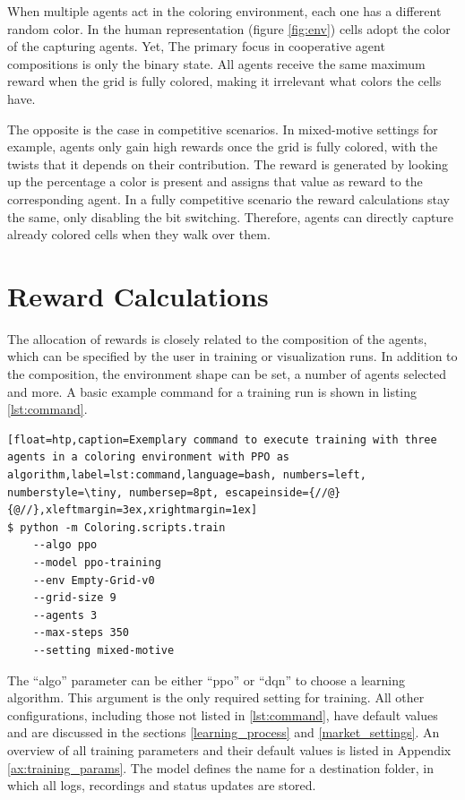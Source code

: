 When multiple agents act in the coloring environment, each one has a different random color. In the human representation (figure \ref{fig:env}) cells adopt the color of the capturing agents. Yet, The primary focus in cooperative agent compositions is only the binary state. All agents receive the same maximum reward when the grid is fully colored, making it irrelevant what colors the cells have.

The opposite is the case in competitive scenarios. In mixed-motive settings for example, agents only gain high rewards once the grid is fully colored, with the twists that it depends on their contribution. The reward is generated by looking up the percentage a color is present and assigns that value as reward to the corresponding agent. In a fully competitive scenario the reward calculations stay the same, only disabling the bit switching. Therefore, agents can directly capture already colored cells when they walk over them.

\section{Reward Calculations}
The allocation of rewards is closely related to the composition of the agents, which can be specified by the user in training or visualization runs. In addition to the composition, the environment shape can be set, a number of agents selected and more. A basic example command for a training run is shown in listing \ref{lst:command}.

\begin{lstlisting}[float=htp,caption=Exemplary command to execute training with three agents in a coloring environment with PPO as algorithm,label=lst:command,language=bash, numbers=left, numberstyle=\tiny, numbersep=8pt, escapeinside={//@}{@//},xleftmargin=3ex,xrightmargin=1ex]
$ python -m Coloring.scripts.train
    --algo ppo
    --model ppo-training
    --env Empty-Grid-v0 
    --grid-size 9 
    --agents 3 
    --max-steps 350
    --setting mixed-motive
\end{lstlisting}

The ``algo'' parameter can be either ``ppo'' or ``dqn'' to choose a learning algorithm. This argument is the only required setting for training. All other configurations, including those not listed in \ref{lst:command}, have default values and are discussed in the sections \ref{learning_process} and \ref{market_settings}. An overview of all training parameters and their default values is listed in Appendix \ref{ax:training_params}. The model defines the name for a destination folder, in which all logs, recordings and status updates are stored.

